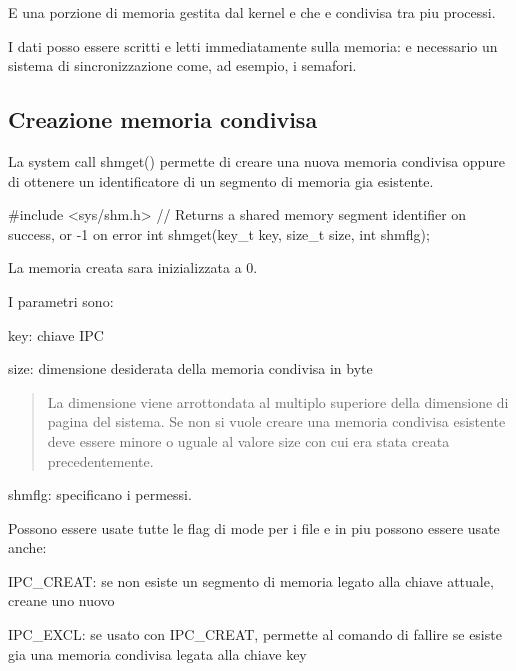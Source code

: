 E\textquotesingle{} una porzione di memoria gestita dal kernel e che e\textquotesingle{} condivisa tra piu\textquotesingle{} processi.

I dati posso essere scritti e letti immediatamente sulla memoria\+: e\textquotesingle{} necessario un sistema di sincronizzazione come, ad esempio, i semafori.

\subsection*{Creazione memoria condivisa}

La system call {\ttfamily shmget()} permette di creare una nuova memoria condivisa oppure di ottenere un identificatore di un segmento di memoria gia\textquotesingle{} esistente. 
\begin{DoxyCode}
\textcolor{preprocessor}{#include <sys/shm.h>}
\textcolor{comment}{// Returns a shared memory segment identifier on success, or -1 on error}
\textcolor{keywordtype}{int} shmget(key\_t key, \textcolor{keywordtype}{size\_t} size, \textcolor{keywordtype}{int} shmflg);
\end{DoxyCode}


La memoria creata sara\textquotesingle{} inizializzata a 0.

I parametri sono\+:
\begin{DoxyItemize}
\item {\ttfamily key}\+: chiave I\+PC
\item {\ttfamily size}\+: dimensione desiderata della memoria condivisa in byte \begin{quote}
La dimensione viene arrottondata al multiplo superiore della dimensione di pagina del sistema. Se non si vuole creare una memoria condivisa esistente deve essere minore o uguale al valore size con cui era stata creata precedentemente. \end{quote}

\item {\ttfamily shmflg}\+: specificano i permessi.

Possono essere usate tutte le flag di {\ttfamily mode} per i file e in piu\textquotesingle{} possono essere usate anche\+:
\begin{DoxyItemize}
\item {\ttfamily I\+P\+C\+\_\+\+C\+R\+E\+AT}\+: se non esiste un segmento di memoria legato alla chiave attuale, creane uno nuovo
\item {\ttfamily I\+P\+C\+\_\+\+E\+X\+CL}\+: se usato con {\ttfamily I\+P\+C\+\_\+\+C\+R\+E\+AT}, permette al comando di fallire se esiste gia\textquotesingle{} una memoria condivisa legata alla chiave {\ttfamily key}
\end{DoxyItemize}
\end{DoxyItemize}

